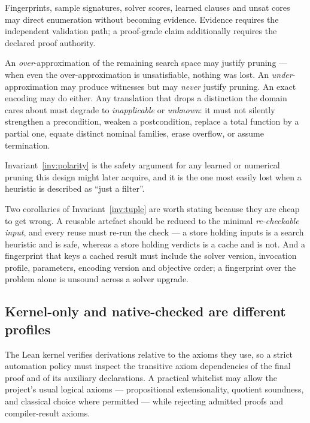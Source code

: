 \begin{invariant}
Fingerprints, sample signatures, solver scores, learned clauses and unsat cores
may direct enumeration without becoming evidence. Evidence requires the
independent validation path; a proof-grade claim additionally requires the
declared proof authority.
\end{invariant}

\begin{invariant}
\label{inv:polarity}
An \emph{over}-approximation of the remaining search space may justify pruning
--- when even the over-approximation is unsatisfiable, nothing was lost. An
\emph{under}-approximation may produce witnesses but may \emph{never} justify
pruning. An exact encoding may do either. Any translation that drops a
distinction the domain cares about must degrade to \emph{inapplicable} or
\emph{unknown}: it must not silently strengthen a precondition, weaken a
postcondition, replace a total function by a partial one, equate distinct
nominal families, erase overflow, or assume termination.
\end{invariant}

Invariant~\ref{inv:polarity} is the safety argument for any learned or
numerical pruning this design might later acquire, and it is the one most
easily lost when a heuristic is described as ``just a filter''.

\begin{remark}
Two corollaries of Invariant~\ref{inv:tuple} are worth stating because they are
cheap to get wrong. A reusable artefact should be reduced to the minimal
\emph{re-checkable input}, and every reuse must re-run the check --- a store
holding inputs is a search heuristic and is safe, whereas a store holding
verdicts is a cache and is not. And a fingerprint that keys a cached result
must include the solver version, invocation profile, parameters, encoding
version and objective order; a fingerprint over the problem alone is unsound
across a solver upgrade.
\end{remark}

\subsection{Kernel-only and native-checked are different profiles}

The Lean kernel verifies derivations relative to the axioms they use, so a
strict automation policy must inspect the transitive axiom dependencies of the
final proof and of its auxiliary declarations. A practical whitelist may allow
the project's usual logical axioms --- propositional extensionality, quotient
soundness, and classical choice where permitted --- while rejecting admitted
proofs and compiler-result axioms.

